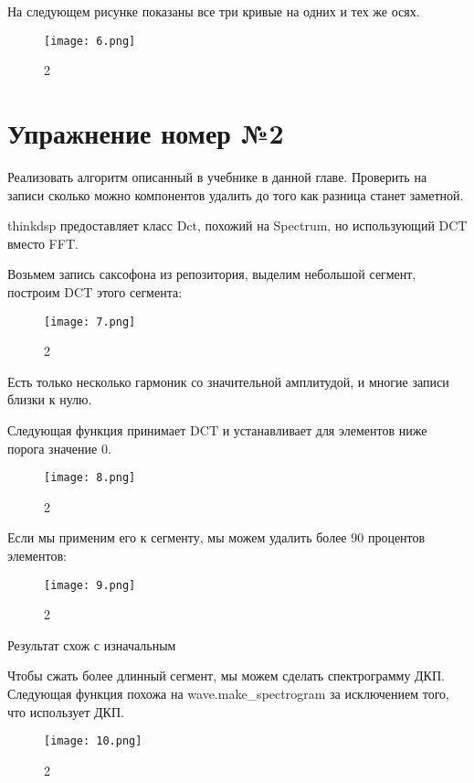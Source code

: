 \documentclass[10pt,a4paper,oneside]{article}
\begin{document}
На следующем рисунке показаны все три кривые на одних и тех же осях.

\begin{figure}[H]
        \centering
        \texttt{[image: 6.png]}
        \caption{2}
        \label{fig:first}
\end{figure}

\section{Упражнение номер №2}

Реализовать алгоритм описанный в учебнике в данной главе. Проверить на записи сколько можно компонентов удалить до того как разница станет заметной. 

thinkdsp предоставляет класс Dct, похожий на Spectrum, но использующий DCT вместо FFT.

Возьмем запись саксофона из репозитория, выделим небольшой сегмент, построим DCT этого сегмента:

\begin{figure}[H]
        \centering
        \texttt{[image: 7.png]}
        \caption{2}
        \label{fig:first}
\end{figure}

Есть только несколько гармоник со значительной амплитудой, и многие записи близки к нулю.

Следующая функция принимает DCT и устанавливает для элементов ниже порога значение 0.

\begin{figure}[H]
        \centering
        \texttt{[image: 8.png]}
        \caption{2}
        \label{fig:first}
\end{figure}

Если мы применим его к сегменту, мы можем удалить более 90 процентов элементов:

\begin{figure}[H]
        \centering
        \texttt{[image: 9.png]}
        \caption{2}
        \label{fig:first}
\end{figure}

Результат схож с изначальным

Чтобы сжать более длинный сегмент, мы можем сделать спектрограмму ДКП. Следующая функция похожа на wave.make_spectrogram за исключением того, что использует ДКП.

\begin{figure}[H]
        \centering
        \texttt{[image: 10.png]}
        \caption{2}
        \label{fig:first}
\end{figure}
\end{document}
